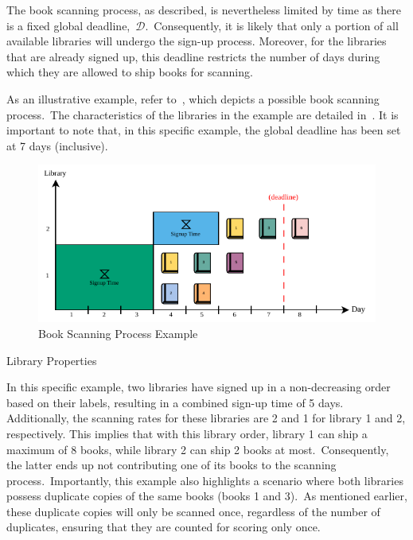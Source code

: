 The book scanning process, as described, is nevertheless limited by time as
there is a fixed global deadline,~$\mathcal{D}$.~Consequently, it is likely that
only a portion of all available libraries will undergo the sign-up process.
Moreover, for the libraries that are already signed up, this deadline restricts
the number of days during which they are allowed to ship books for scanning.

As an illustrative example, refer to~, which depicts a
possible book scanning process.~The characteristics of the libraries in the
example are detailed in~. It is important to
note that, in this specific example, the global deadline has been set at 7 days
(inclusive).

\begin{figure}[h]
  \centering
  \includegraphics[width=\textwidth,keepaspectratio]{../assets/bs/bs-example.pdf}
  \caption{Book Scanning Process Example}
  \label{fig:bs-example}
\end{figure}

\begin{table}[ht]
  \centering
  
  \caption{Library Properties}
  \label{tab:bs-library-properties}
\end{table}

In this specific example, two libraries have signed up in a non-decreasing order
based on their labels, resulting in a combined sign-up time of 5 days.
Additionally, the scanning rates for these libraries are 2 and 1 for library 1
and 2, respectively. This implies that with this library order, library 1 can
ship a maximum of 8 books, while library 2 can ship 2 books at
most.~Consequently, the latter ends up not contributing one of its books to the
scanning process.~Importantly, this example also highlights a scenario where
both libraries possess duplicate copies of the same books (books 1 and 3).~As
mentioned earlier, these duplicate copies will only be scanned once, regardless
of the number of duplicates, ensuring that they are counted for scoring only
once.

